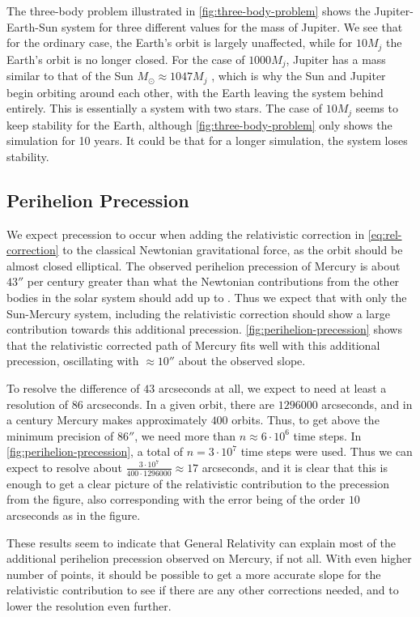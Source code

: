 \documentclass[../main.tex]{subfiles}
\begin{document}
The three-body problem illustrated in \cref{fig:three-body-problem} shows the Jupiter-Earth-Sun system for three different values for the mass of Jupiter. We see that for the ordinary case, the Earth's orbit is largely unaffected, while for $10M_j$ the Earth's orbit is no longer closed. For the case of $1000 M_j$, Jupiter has a mass similar to that of the Sun $M_\odot \approx 1047 M_j$ \cite{nasa-const}, which is why the Sun and Jupiter begin orbiting around each other, with the Earth leaving the system behind entirely. This is essentially a system with two stars. The case of $10 M_j$ seems to keep stability for the Earth, although \cref{fig:three-body-problem} only shows the simulation for 10 years. It could be that for a longer simulation, the system loses stability.

\subsection{Perihelion Precession}

We expect precession to occur when adding the relativistic correction in \cref{eq:rel-correction} to the classical Newtonian gravitational force, as the orbit should be almost closed elliptical. The observed perihelion precession of Mercury is about $43''$ per century greater than what the Newtonian contributions from the other bodies in the solar system should add up to \cite{Pollock2003}. Thus we expect that with only the Sun-Mercury system, including the relativistic correction should show a large contribution towards this additional precession. \cref{fig:perihelion-precession} shows that the relativistic corrected path of Mercury fits well with this additional precession, oscillating with $\approx 10''$ about the observed slope.

To resolve the difference of $43$ arcseconds at all, we expect to need at least a resolution of $86$ arcseconds. In a given orbit, there are $1296000$ arcseconds, and in a century Mercury makes approximately $400$ orbits. Thus, to get above the minimum precision of $86''$, we need more than $n \approx 6 \cdot 10^6$ time steps. In \cref{fig:perihelion-precession}, a total of $n = 3 \cdot 10^7$ time steps were used. Thus we can expect to resolve about $\frac{3 \cdot 10^7}{400 \cdot 1296000} \approx 17$ arcseconds, and it is clear that this is enough to get a clear picture of the relativistic contribution to the precession from the figure, also corresponding with the error being of the order $10$ arcseconds as in the figure.

These results seem to indicate that General Relativity can explain most of the additional perihelion precession observed on Mercury, if not all. With even higher number of points, it should be possible to get a more accurate slope for the relativistic contribution to see if there are any other corrections needed, and to lower the resolution even further.
\end{document}
